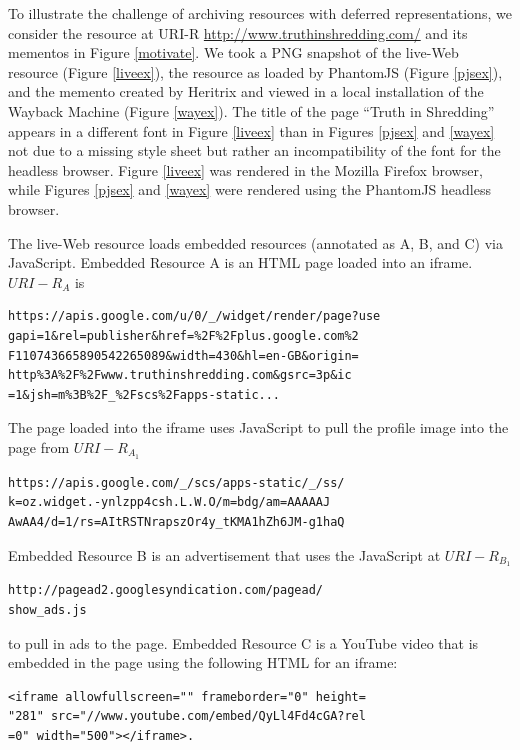 \documentclass{ipres_proc_article-sp}
\begin{document}
To illustrate the challenge of archiving resources with deferred representations, we consider the resource at URI-R \url{http://www.truthinshredding.com/} and its mementos in Figure \ref{motivate}. We took a PNG snapshot of the live-Web resource (Figure \ref{liveex}), the resource as loaded by PhantomJS (Figure \ref{pjsex}), and the memento created by Heritrix and viewed in a local installation of the Wayback Machine (Figure \ref{wayex}). The title of the page ``Truth in Shredding'' appears in a different font in Figure \ref{liveex} than in Figures \ref{pjsex} and \ref{wayex} not due to a missing style sheet but rather an incompatibility of the font for the headless browser. Figure \ref{liveex} was rendered in the Mozilla Firefox browser, while Figures \ref{pjsex} and \ref{wayex} were rendered using the PhantomJS headless browser.

The live-Web resource loads embedded resources (annotated as A, B, and C) via JavaScript. Embedded Resource A is an HTML page loaded into an iframe. $URI-R_A$ is
\begin{verbatim}
https://apis.google.com/u/0/_/widget/render/page?use
gapi=1&rel=publisher&href=%2F%2Fplus.google.com%2
F110743665890542265089&width=430&hl=en-GB&origin=
http%3A%2F%2Fwww.truthinshredding.com&gsrc=3p&ic
=1&jsh=m%3B%2F_%2Fscs%2Fapps-static...
\end{verbatim}
\vskip -3mm
The page loaded into the iframe uses JavaScript to pull the profile image into the page from $URI-R_{A_1}$ 
\begin{verbatim}
https://apis.google.com/_/scs/apps-static/_/ss/
k=oz.widget.-ynlzpp4csh.L.W.O/m=bdg/am=AAAAAJ
AwAA4/d=1/rs=AItRSTNrapszOr4y_tKMA1hZh6JM-g1haQ
\end{verbatim}
Embedded Resource B is an advertisement that uses the JavaScript at $URI-R_{B_1}$ 
\begin{verbatim}
http://pagead2.googlesyndication.com/pagead/
show_ads.js
\end{verbatim}
to pull in ads to the page. Embedded Resource C is a YouTube video that is embedded in the page using the following HTML for an iframe:
 
\begin{verbatim}
<iframe allowfullscreen="" frameborder="0" height=
"281" src="//www.youtube.com/embed/QyLl4Fd4cGA?rel
=0" width="500"></iframe>.
\end{verbatim}
\end{document}
